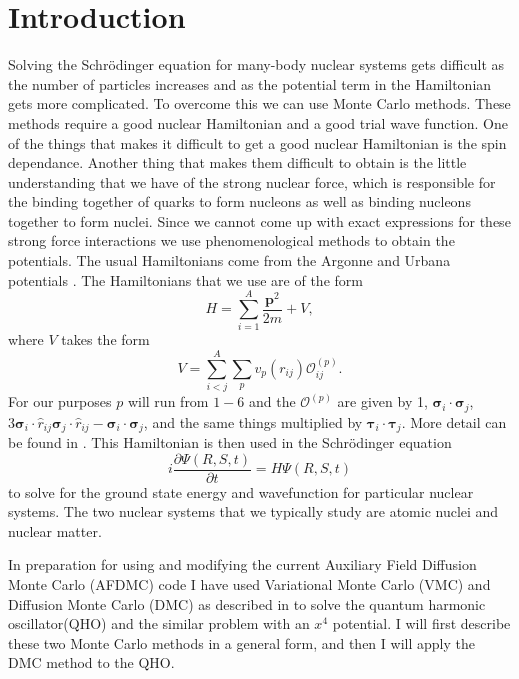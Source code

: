 \section*{Introduction}
Solving the Schr\"odinger equation for many-body nuclear systems gets difficult as the number of particles increases and as the potential term in the Hamiltonian gets more complicated. To overcome this we can use Monte Carlo methods. These methods require a good nuclear Hamiltonian and a good trial wave function. One of the things that makes it difficult to get a good nuclear Hamiltonian is the spin dependance. Another thing that makes them difficult to obtain is the little understanding that we have of the strong nuclear force, which is responsible for the binding together of quarks to form nucleons as well as binding nucleons together to form nuclei. Since we cannot come up with exact expressions for these strong force interactions we use phenomenological methods to obtain the potentials. The usual Hamiltonians come from the Argonne and Urbana potentials \cite{wiringa1984, muller1981}. The Hamiltonians that we use are of the form
\begin{equation}
  H=\sum\limits_{i=1}^{A} \frac{\mathbf{p}^2}{2m} + V,
\end{equation}
where $V$ takes the form
\begin{equation}
  V = \sum\limits_{i<j}^{A} \sum\limits_{p} v_{p}(r_{ij}) \mathcal{O}^{(p)}_{ij}.
\end{equation}
For our purposes $p$ will run from $1-6$ and the $\mathcal{O}^{(p)}$ are given by 1, $\mathbf{\sigma}_i \cdot \mathbf{\sigma}_j$, $3\mathbf{\sigma}_i \cdot \hat{r}_{ij}\mathbf{\sigma}_j \cdot \hat{r}_{ij} - \mathbf{\sigma}_i \cdot \mathbf{\sigma}_j$, and the same things multiplied by $\mathbf{\tau}_i \cdot \mathbf{\tau}_j$. More detail can be found in \cite{schmidt1999}. This Hamiltonian is then used in the Schr\"odinger equation
\begin{equation}
  i\frac{\partial \Psi(R,S,t)}{\partial t} = H\Psi(R,S,t)
\end{equation}
to solve for the ground state energy and wavefunction for particular nuclear systems. The two nuclear systems that we typically study are atomic nuclei and nuclear matter.

In preparation for using and modifying the current Auxiliary Field Diffusion Monte Carlo (AFDMC) code \cite{schmidt1999,gandolfi2014} I have used Variational Monte Carlo (VMC) and Diffusion Monte Carlo (DMC) as described in \cite{foulkes2001,kosztin1996} to solve the quantum harmonic oscillator(QHO) and the similar problem with an $x^4$ potential. I will first describe these two Monte Carlo methods in a general form, and then I will apply the DMC method to the QHO.


